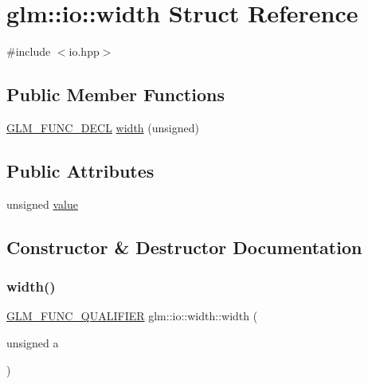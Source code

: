 \hypertarget{structglm_1_1io_1_1width}{}\section{glm\+:\+:io\+:\+:width Struct Reference}
\label{structglm_1_1io_1_1width}


{\ttfamily \#include $<$io.\+hpp$>$}

\subsection*{Public Member Functions}
\begin{DoxyCompactItemize}
\item 
\mbox{\hyperlink{setup_8hpp_ab2d052de21a70539923e9bcbf6e83a51}{G\+L\+M\+\_\+\+F\+U\+N\+C\+\_\+\+D\+E\+CL}} \mbox{\hyperlink{structglm_1_1io_1_1width_a1576674b7e08dc5014ce4f41ac6eea5b}{width}} (unsigned)
\end{DoxyCompactItemize}
\subsection*{Public Attributes}
\begin{DoxyCompactItemize}
\item 
unsigned \mbox{\hyperlink{structglm_1_1io_1_1width_a6bf1338eb947811d36ec93bd2e9b8425}{value}}
\end{DoxyCompactItemize}


\subsection{Constructor \& Destructor Documentation}
\mbox{\label{structglm_1_1io_1_1width_a1576674b7e08dc5014ce4f41ac6eea5b}} 
\subsubsection{\texorpdfstring{width()}{width()}}
{\footnotesize\ttfamily \mbox{\hyperlink{setup_8hpp_a33fdea6f91c5f834105f7415e2a64407}{G\+L\+M\+\_\+\+F\+U\+N\+C\+\_\+\+Q\+U\+A\+L\+I\+F\+I\+ER}} glm\+::io\+::width\+::width (\begin{DoxyParamCaption}\item[{unsigned}]{a }\end{DoxyParamCaption})\hspace{0.3cm}{\ttfamily [explicit]}}



